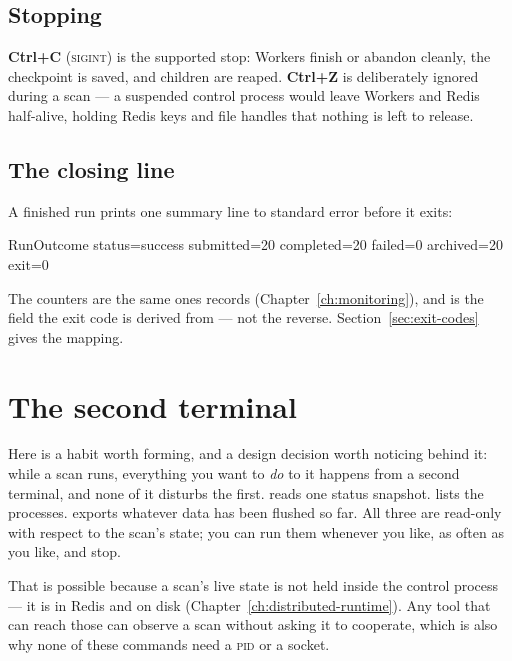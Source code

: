 \subsection{Stopping}

\textbf{Ctrl+C} (\textsc{sigint}) is the supported stop: Workers finish or abandon
cleanly, the checkpoint is saved, and children are reaped. \textbf{Ctrl+Z} is
deliberately ignored during a scan --- a suspended control process would leave Workers
and Redis half-alive, holding Redis keys and file handles that nothing is left to
release.

\subsection{The closing line}

A finished run prints one summary line to standard error before it exits:

\begin{terminal}
\begin{jout}
RunOutcome status=success submitted=20 completed=20 failed=0 archived=20 exit=0
\end{jout}
\end{terminal}

The counters are the same ones  records
(Chapter~\ref{ch:monitoring}), and  is the field the exit code is derived
from --- not the reverse. Section~\ref{sec:exit-codes} gives the mapping.

\section{The second terminal}
\label{sec:cli-second-terminal}

Here is a habit worth forming, and a design decision worth noticing behind it: while a
scan runs, everything you want to \emph{do} to it happens from a second terminal, and
none of it disturbs the first.  reads one status snapshot.
 lists the processes.  exports whatever data has
been flushed so far. All three are read-only with respect to the scan's state; you can
run them whenever you like, as often as you like, and stop.

That is possible because a scan's live state is not held inside the control process ---
it is in Redis and on disk (Chapter~\ref{ch:distributed-runtime}). Any tool that can
reach those can observe a scan without asking it to cooperate, which is also why none of
these commands need a \textsc{pid} or a socket.

